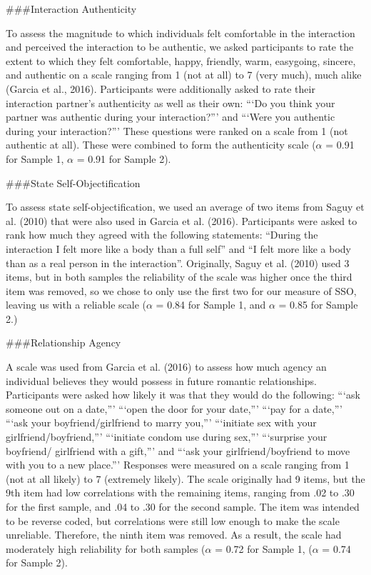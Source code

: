 \documentclass[
  man]{apa6}
\begin{document}
\#\#\#Interaction Authenticity

To assess the magnitude to which individuals felt comfortable in the interaction and perceived the interaction to be authentic, we asked participants to rate the extent to which they felt comfortable, happy, friendly, warm, easygoing, sincere, and authentic on a scale ranging from 1 (not at all) to 7 (very much), much alike (Garcia et al., 2016). Participants were additionally asked to rate their interaction partner's authenticity as well as their own: \enquote{`Do you think your partner was authentic during your interaction?}' and \enquote{`Were you authentic during your interaction?}' These questions were ranked on a scale from 1 (not authentic at all). These were combined to form the authenticity scale (\(\alpha\) = 0.91 for Sample 1, \(\alpha\) = 0.91 for Sample 2).

\#\#\#State Self-Objectification

To assess state self-objectification, we used an average of two items from Saguy et al. (2010) that were also used in Garcia et al. (2016). Participants were asked to rank how much they agreed with the following statements: \enquote{During the interaction I felt more like a body than a full self} and \enquote{I felt more like a body than as a real person in the interaction}. Originally, Saguy et al. (2010) used 3 items, but in both samples the reliability of the scale was higher once the third item was removed, so we chose to only use the first two for our measure of SSO, leaving us with a reliable scale (\(\alpha\) = 0.84 for Sample 1, and \(\alpha\) = 0.85 for Sample 2.)

\#\#\#Relationship Agency

A scale was used from Garcia et al. (2016) to assess how much agency an individual believes they would possess in future romantic relationships. Participants were asked how likely it was that they would do the following: \enquote{`ask someone out on a date,}' \enquote{`open the door for your date,}' \enquote{`pay for a date,}' \enquote{`ask your boyfriend/girlfriend to marry you,}' \enquote{`initiate sex with your girlfriend/boyfriend,}' \enquote{`initiate condom use during sex,}' \enquote{`surprise your boyfriend/ girlfriend with a gift,}' and \enquote{`ask your girlfriend/boyfriend to move with you to a new place.}' Responses were measured on a scale ranging from 1 (not at all likely) to 7 (extremely likely). The scale originally had 9 items, but the 9th item had low correlations with the remaining items, ranging from .02 to .30 for the first sample, and .04 to .30 for the second sample. The item was intended to be reverse coded, but correlations were still low enough to make the scale unreliable. Therefore, the ninth item was removed. As a result, the scale had moderately high reliability for both samples (\(\alpha\) = 0.72 for Sample 1, (\(\alpha\) = 0.74 for Sample 2).
\end{document}
